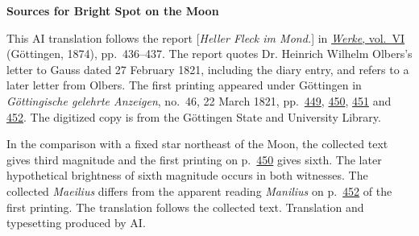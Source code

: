 \clearpage\thispagestyle{empty}
\begin{center}\textbf{Sources for Bright Spot on the Moon}\end{center}
\noindent This AI translation follows the report [\textit{Heller Fleck im Mond.}] in \href{https://gdz.sub.uni-goettingen.de/id/PPN236007467}{\textit{Werke}, vol.~VI} (Göttingen, 1874), pp.~436--437. The report quotes Dr. Heinrich Wilhelm Olbers’s letter to Gauss dated 27 February 1821, including the diary entry, and refers to a later letter from Olbers. The first printing appeared under Göttingen in \textit{Göttingische gelehrte Anzeigen}, no.~46, 22 March 1821, pp.~\href{https://images.p.sub.uni-goettingen.de/iiif/image/gdz:PPN319721507_1821:00000451/full/1600,/0/default.jpg}{449}, \href{https://images.p.sub.uni-goettingen.de/iiif/image/gdz:PPN319721507_1821:00000452/full/1600,/0/default.jpg}{450}, \href{https://images.p.sub.uni-goettingen.de/iiif/image/gdz:PPN319721507_1821:00000453/full/1600,/0/default.jpg}{451} and \href{https://images.p.sub.uni-goettingen.de/iiif/image/gdz:PPN319721507_1821:00000454/full/1600,/0/default.jpg}{452}. The digitized copy is from the Göttingen State and University Library.
\par\smallskip\noindent In the comparison with a fixed star northeast of the Moon, the collected text gives third magnitude and the first printing on p.~\href{https://images.p.sub.uni-goettingen.de/iiif/image/gdz:PPN319721507_1821:00000452/full/1600,/0/default.jpg}{450} gives sixth. The later hypothetical brightness of sixth magnitude occurs in both witnesses. The collected \textit{Maeilius} differs from the apparent reading \textit{Manilius} on p.~\href{https://images.p.sub.uni-goettingen.de/iiif/image/gdz:PPN319721507_1821:00000454/full/1600,/0/default.jpg}{452} of the first printing. The translation follows the collected text. Translation and typesetting produced by AI.
\clearpage
